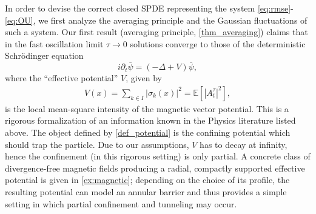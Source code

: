 \documentclass[a4paper,10pt]{amsart}
\theoremstyle{remark}
\numberwithin{equation}{section}
\begin{document}
In order to devise the correct closed SPDE representing the system
\eqref{eq:rmse}-\eqref{eq:OU}, we first analyze the averaging principle and the Gaussian fluctuations of such a system. Our first result (averaging principle, \autoref{thm_averaging}) claims that in the fast oscillation limit $\tau\rightarrow0$ solutions converge to those of the deterministic Schr\"{o}dinger equation
\begin{equation*}
i\partial_{t}\bar{\psi}=(-\Delta+V)\bar{\psi},\tag{ASE}\label{eq:averaging}%
\end{equation*}
where the ``effective potential'' $V$, given by%
\begin{align}\label{def_potential}
    V(x)=\sum_{k\in I}|\sigma_{k}(x)|^{2} =\mathbb{E} \left[|A_t^{\tau}|^2\right] ,
\end{align}
is the local mean-square intensity of the magnetic vector potential. This is a rigorous formalization of an information known in the Physics literature listed above. The object defined by \eqref{def_potential} is the confining potential which should trap the particle. Due to our assumptions, $V$ has to decay at infinity, hence the confinement (in this rigorous setting) is only partial. A concrete class of divergence-free magnetic fields producing a radial, compactly supported effective potential is given in \cref{ex:magnetic}; depending on the choice of its profile, the resulting potential can model an annular barrier and thus provides a simple setting in which partial confinement and tunneling may occur.
\end{document}

